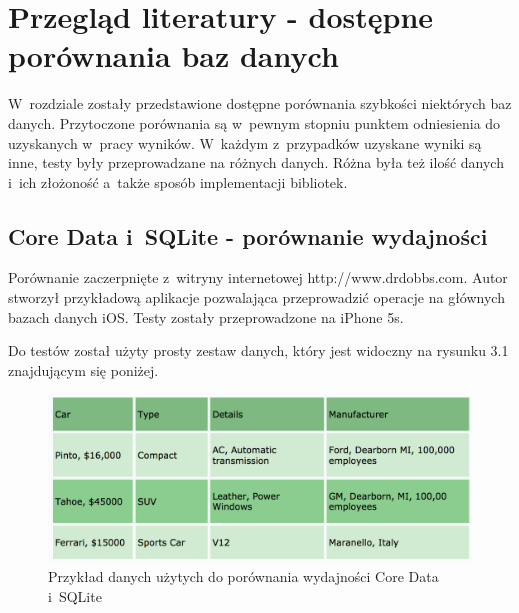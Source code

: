 \section{Przegląd literatury - dostępne porównania baz danych}

 W~rozdziale zostały przedstawione dostępne porównania szybkości niektórych baz danych. Przytoczone porównania są w~pewnym stopniu punktem odniesienia do uzyskanych w~pracy wyników. W~każdym z~przypadków uzyskane wyniki są inne, testy były przeprowadzane na różnych danych. Różna była też ilość danych i~ich złożoność a~także sposób implementacji bibliotek. 

\subsection{Core Data i~SQLite - porównanie wydajności}

Porównanie zaczerpnięte z~witryny internetowej http://www.drdobbs.com. Autor stworzył przykładową aplikacje pozwalająca przeprowadzić operacje na głównych bazach danych iOS. Testy zostały przeprowadzone na iPhone 5s. \par

Do testów został użyty prosty zestaw danych, który jest widoczny na rysunku 3.1 znajdującym się poniżej. 

\begin{figure}[h]
	\includegraphics[width=\linewidth]{img/coredata_sql_test.png}
	\caption{Przykład danych użytych do porównania wydajności Core Data i~SQLite}
	\label{fig: CoreData_SQLite_test_data}
\end{figure}

